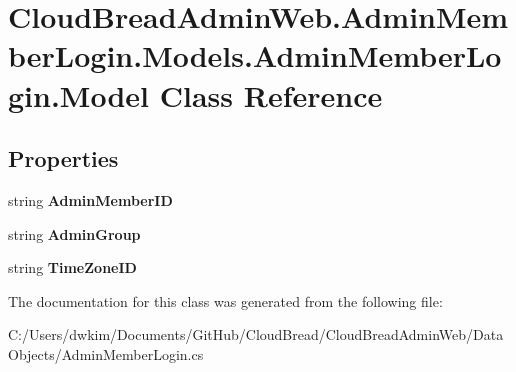 \hypertarget{class_cloud_bread_admin_web_1_1_admin_member_login_1_1_models_1_1_admin_member_login_1_1_model}{}\section{Cloud\+Bread\+Admin\+Web.\+Admin\+Member\+Login.\+Models.\+Admin\+Member\+Login.\+Model Class Reference}
\label{class_cloud_bread_admin_web_1_1_admin_member_login_1_1_models_1_1_admin_member_login_1_1_model}
\subsection*{Properties}
\begin{DoxyCompactItemize}
\item 
string {\bfseries Admin\+Member\+ID}\hypertarget{class_cloud_bread_admin_web_1_1_admin_member_login_1_1_models_1_1_admin_member_login_1_1_model_a359d7323a7f6f60b67c8cfdb6c209518}{}\label{class_cloud_bread_admin_web_1_1_admin_member_login_1_1_models_1_1_admin_member_login_1_1_model_a359d7323a7f6f60b67c8cfdb6c209518}

\item 
string {\bfseries Admin\+Group}\hypertarget{class_cloud_bread_admin_web_1_1_admin_member_login_1_1_models_1_1_admin_member_login_1_1_model_a009a613167b733fd46fc4ed132b3a1b1}{}\label{class_cloud_bread_admin_web_1_1_admin_member_login_1_1_models_1_1_admin_member_login_1_1_model_a009a613167b733fd46fc4ed132b3a1b1}

\item 
string {\bfseries Time\+Zone\+ID}\hypertarget{class_cloud_bread_admin_web_1_1_admin_member_login_1_1_models_1_1_admin_member_login_1_1_model_a693f75b7f2dcccd154d9e0c1f275023e}{}\label{class_cloud_bread_admin_web_1_1_admin_member_login_1_1_models_1_1_admin_member_login_1_1_model_a693f75b7f2dcccd154d9e0c1f275023e}

\end{DoxyCompactItemize}


The documentation for this class was generated from the following file\+:\begin{DoxyCompactItemize}
\item 
C\+:/\+Users/dwkim/\+Documents/\+Git\+Hub/\+Cloud\+Bread/\+Cloud\+Bread\+Admin\+Web/\+Data\+Objects/Admin\+Member\+Login.\+cs\end{DoxyCompactItemize}
